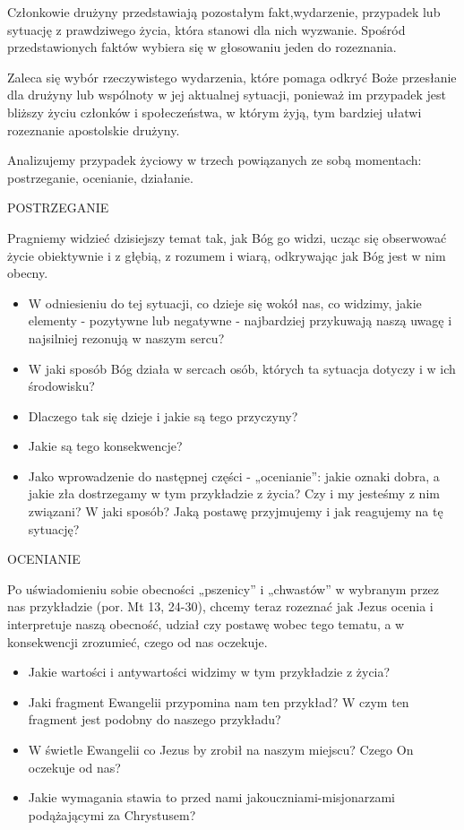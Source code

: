 ﻿\documentclass[9pt,twoside]{extarticle}
\begin{document}
{Członkowie drużyny przedstawiają pozostałym fakt,\linebreak wydarzenie, przypadek lub sytuację z prawdziwego życia, która stanowi dla nich wyzwanie. Spośród przedstawionych faktów wybiera się w głosowaniu jeden do rozeznania.


Zaleca się wybór rzeczywistego wydarzenia, które pomaga odkryć Boże przesłanie dla drużyny lub wspólnoty w jej aktualnej sytuacji, ponieważ im przypadek jest bliższy życiu członków i społeczeństwa, w którym żyją, tym bardziej ułatwi rozeznanie apostolskie drużyny.


Analizujemy przypadek życiowy w trzech powiązanych ze sobą momentach: postrzeganie, ocenianie, działanie.


\filbreak POSTRZEGANIE


Pragniemy widzieć dzisiejszy temat tak, jak Bóg go widzi, ucząc się obserwować życie obiektywnie i z głębią, z rozumem i wiarą, odkrywając jak Bóg jest w nim obecny.


\begin{itemize}
\item W odniesieniu do tej sytuacji, co dzieje się wokół nas, co widzimy, jakie elementy - pozytywne lub negatywne - najbardziej przykuwają naszą uwagę i najsilniej rezonują w naszym sercu?
\item W jaki sposób Bóg działa w sercach osób, których ta sytuacja dotyczy i w ich środowisku?
\item Dlaczego tak się dzieje i jakie są tego przyczyny?
\item Jakie są tego konsekwencje?
\item Jako wprowadzenie do następnej części - „ocenianie”: jakie oznaki dobra, a jakie zła dostrzegamy w tym przykładzie z życia? Czy i my jesteśmy z nim związani? W jaki sposób? Jaką postawę przyjmujemy i jak reagujemy na tę sytuację?
\end{itemize}


OCENIANIE


Po uświadomieniu sobie obecności „pszenicy” i „chwastów” w wybranym przez nas przykładzie (por. Mt 13, 24-30), chcemy teraz rozeznać jak Jezus ocenia i interpretuje naszą obecność, udział czy postawę wobec tego tematu, a w konsekwencji zrozumieć, czego od nas oczekuje.


\begin{itemize}
\item Jakie wartości i antywartości widzimy w tym przykładzie z życia?
\item Jaki fragment Ewangelii przypomina nam ten przykład? W czym ten fragment jest podobny do naszego przykładu?
\item W świetle Ewangelii co Jezus by zrobił na naszym miejscu? Czego On oczekuje od nas?
\item Jakie wymagania stawia to przed nami jako\linebreak uczniami-misjonarzami podążającymi za Chrystusem?
\end{itemize}


}
\end{document}

